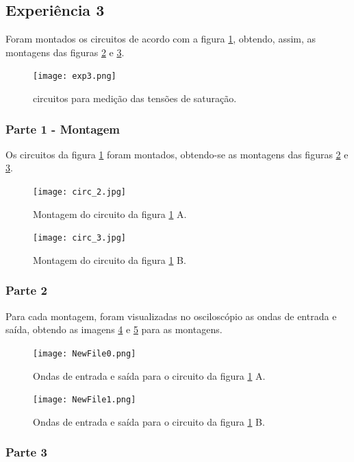 \documentclass{abntex2}
\begin{document}
\clearpage

\subsection{Experiência 3}

Foram montados os circuitos de acordo com a figura \ref{fig:circuito3}, obtendo, assim, as montagens das figuras \ref{fig:montagem3} e \ref{fig:montagem4}.

\begin{figure}[h]
  \centering
  \texttt{[image: exp3.png]}
  \caption{circuitos para medição das tensões de saturação.}
  \label{fig:circuito3}
\end{figure}

\subsubsection{Parte 1 - Montagem}

Os circuitos da figura \ref{fig:circuito3} foram montados, obtendo-se as montagens das figuras \ref{fig:montagem3} e \ref{fig:montagem4}.

\begin{figure}[h]
  \centering
  \texttt{[image: circ\_2.jpg]}
  \caption{Montagem do circuito da figura \ref{fig:circuito3} A.}
  \label{fig:montagem3}
\end{figure}
\begin{figure}[h]
  \centering
  \texttt{[image: circ\_3.jpg]}
  \caption{Montagem do circuito da figura \ref{fig:circuito3} B.}
  \label{fig:montagem4}
\end{figure}

\subsubsection{Parte 2}
Para cada montagem, foram visualizadas no osciloscópio as ondas de entrada e saída, obtendo as imagens \ref{fig:inout1} e \ref{fig:inout2} para as montagens.
\begin{figure}[h]
  \centering
  \texttt{[image: NewFile0.png]}
  \caption{Ondas de entrada e saída para o circuito da figura \ref{fig:circuito3} A.}
  \label{fig:inout1}
\end{figure}
\begin{figure}[h]
  \centering
  \texttt{[image: NewFile1.png]}
  \caption{Ondas de entrada e saída para o circuito da figura \ref{fig:circuito3} B.}
  \label{fig:inout2}
\end{figure}
\pagebreak
\subsubsection{Parte 3}
\end{document}

